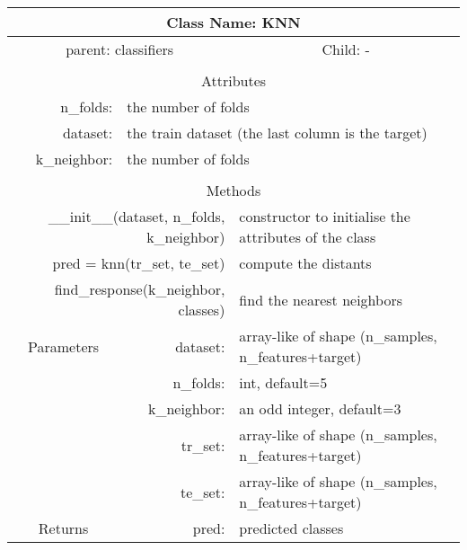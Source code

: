 {\small
\begin{tabular}{llll}
\toprule
\multicolumn{4}{|c|}{Class Name: KNN} \\
\midrule
\multicolumn{2}{|c|}{parent: classifiers} &\multicolumn{2}{|c|}{Child: -} \\\bottomrule


\multicolumn{4}{c}{} \\\bottomrule
\multicolumn{4}{|c|}{Attributes} \\\midrule
\multicolumn{1}{|r}{n\_folds: } & \multicolumn{3}{l|}{the number of folds } \\
\multicolumn{1}{|r}{dataset: } & \multicolumn{3}{l|}{the train dataset (the last column is the target) } \\
\multicolumn{1}{|r}{k\_neighbor: } & \multicolumn{3}{l|}{the number of folds } \\\bottomrule


\multicolumn{4}{c}{} \\\bottomrule
\multicolumn{4}{|c|}{Methods} \\\midrule
\multicolumn{2}{|r}{\_\_init\_\_(dataset, n\_folds, k\_neighbor) } & \multicolumn{2}{l|}{constructor to initialise the attributes of the class} \\
\multicolumn{2}{|r}{pred = knn(tr\_set, te\_set) } & \multicolumn{2}{l|}{compute the distants} \\
\multicolumn{2}{|r}{find\_response(k\_neighbor, classes) } & \multicolumn{2}{l|}{find the nearest neighbors} \\\midrule


\multicolumn{1}{|c|}{Parameters}
& \multicolumn{1}{|r}{dataset:}& \multicolumn{2}{l|}{array-like of shape (n\_samples, n\_features+target)}\\
\multicolumn{1}{|l|}{} & \multicolumn{1}{|r}{n\_folds:}& \multicolumn{2}{l|}{int, default=5}\\
\multicolumn{1}{|l|}{} & \multicolumn{1}{|r}{k\_neighbor:}& \multicolumn{2}{l|}{an odd integer, default=3}\\
\multicolumn{1}{|l|}{}& \multicolumn{1}{|r}{tr\_set:}& \multicolumn{2}{l|}{array-like of shape (n\_samples, n\_features+target)}\\
\multicolumn{1}{|l|}{}& \multicolumn{1}{|r}{te\_set:}& \multicolumn{2}{l|}{array-like of shape (n\_samples, n\_features+target)}\\\midrule

\multicolumn{1}{|c|}{Returns} & \multicolumn{1}{|r}{pred:}& \multicolumn{2}{l|}{predicted classes}\\




\bottomrule
\end{tabular}}